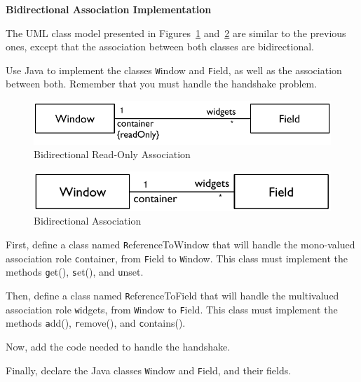 \documentclass[a4paper,11pt]{memoir}
\newcommand{\code}[1]{{\texttt #1}}
\begin{document}
\begin{exercise}
	\textbf{Bidirectional Association Implementation}

The UML class model presented in Figures~\ref{fig:readOnly} and~\ref{fig:bidirectional}
are similar to the previous ones, except that the association between both classes are bidirectional.

Use Java to implement the classes \code{Window} and \code{Field}, as well as the association between both.
Remember that you must handle the handshake problem.

\begin{figure}[htbp]
	\centering
		\includegraphics[scale=.8]{CD-WindowFieldReadOnly.pdf}
	\caption{Bidirectional Read-Only Association}
	\label{fig:readOnly}
\end{figure}

\begin{figure}[htbp]
	\centering
		\includegraphics[scale=.8]{CD-WindowField.pdf}
	\caption{Bidirectional Association}
	\label{fig:bidirectional}
\end{figure}	


\begin{inparaenum}[(A)]
	\item First, define a class named \code{ReferenceToWindow} that will handle the mono-valued association role \code{container}, from \code{Field} to \code{Window}. This class must implement the methods \code{get()}, \code{set()}, and \code{unset}.
	\item Then, define a class named \code{ReferenceToField} that will handle the multivalued association role \code{widgets}, from \code{Window} to \code{Field}. This class must implement the methods \code{add()}, \code{remove()}, and \code{contains()}.
	\item Now, add the code needed to handle the handshake. 
	\item Finally, declare the Java classes \code{Window} and \code {Field}, and their fields.
\end{inparaenum}
	
\end{exercise}
\end{document}
